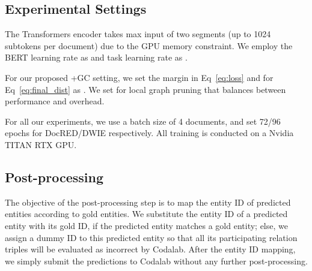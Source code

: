 \documentclass[11pt]{article}
\begin{document}
\subsection{Experimental Settings}
\label{appd:impl}

The Transformers encoder takes max input of two segments (up to 1024 subtokens per document) due to the GPU memory constraint. We employ the BERT learning rate as  and task learning rate as .

For our proposed +GC setting, we set the margin  in Eq~\eqref{eq:loss} and  for Eq~\eqref{eq:final_dist} as . We set  for local graph pruning that balances between performance and overhead.

For all our experiments, we use a batch size of 4 documents, and set 72/96 epochs for DocRED/DWIE respectively. All training is conducted on a Nvidia TITAN RTX GPU.

\subsection{Post-processing}
\label{appd:post}

The objective of the post-processing step is to map the entity ID of predicted entities according to gold entities. We substitute the entity ID of a predicted entity with its gold ID, if the predicted entity matches a gold entity; else, we assign a dummy ID to this predicted entity so that all its participating relation triples will be evaluated as incorrect by Codalab. After the entity ID mapping, we simply submit the predictions to Codalab without any further post-processing.
 
\end{document}
